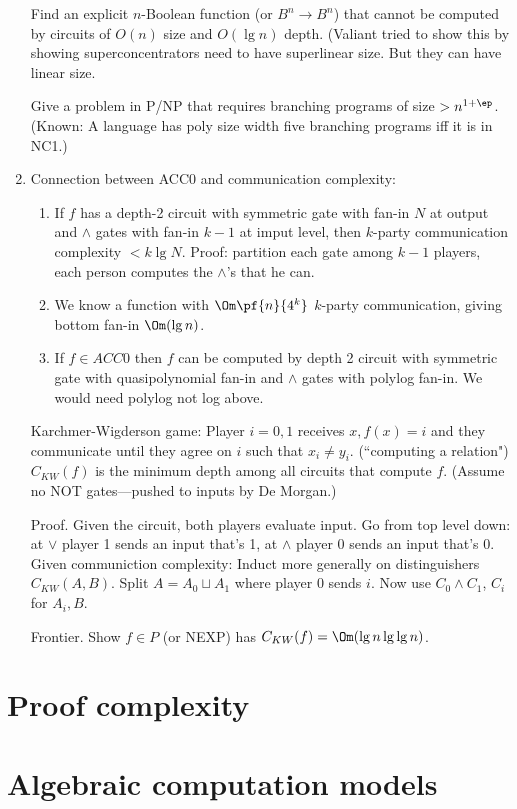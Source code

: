 \begin{enumerate}
Find an explicit $n$-Boolean function (or $B^n\to B^n$) that cannot be computed by circuits of $O(n)$ size and $O(\lg n)$ depth. (Valiant tried to show this by showing superconcentrators need to have superlinear size. But they can have linear size.

Give a problem in P/NP that requires branching programs of size $>n^{1+\ep}$. (Known: A language has poly size width five branching programs iff it is in NC1.)
\item
Connection between ACC0 and communication complexity:
\begin{enumerate}
\item
If $f$ has a depth-2 circuit with symmetric gate with fan-in $N$ at output and $\wedge$ gates with fan-in $k-1$ at imput level, then $k$-party communication complexity $<k\lg N$. Proof: partition each gate among $k-1$ players, each person computes the $\wedge$'s that he can.
\item
We know a function with $\Om\pf{n}{4^k}$ $k$-party communication, giving bottom fan-in $\Om(\lg n)$.
\item 
If $f\in ACC0$ then $f$ can be computed by depth 2 circuit with symmetric gate with quasipolynomial fan-in and $\wedge$ gates with polylog fan-in. We would need polylog not log above.
\end{enumerate}

Karchmer-Wigderson game: Player $i=0,1$ receives $x,f(x)=i$ and they communicate until they agree on $i$ such that $x_i\ne y_i$. (``computing a relation") $C_{KW}(f)$ is the minimum depth among all circuits that compute $f$. (Assume no NOT gates---pushed to inputs by De Morgan.)

Proof. Given the circuit, both players evaluate input. Go from top level down: at $\vee$ player 1 sends an input that's 1, at $\wedge$ player 0 sends an input that's 0. Given communiction complexity: Induct more generally on distinguishers $C_{KW}(A,B)$. Split $A=A_0\sqcup A_1$ where player 0 sends $i$. Now use $C_0\wedge C_1$, $C_i$ for $A_i,B$.

Frontier. Show $f\in P$ (or NEXP) has $C_{KW}(f)=\Om(\lg n\lg\lg n)$.
\end{enumerate}

\section{Proof complexity}
\section{Algebraic computation models}


